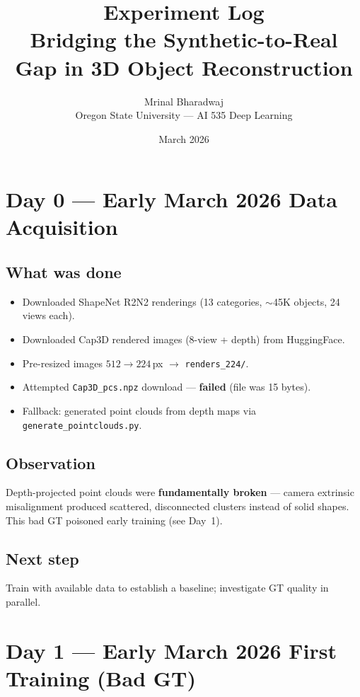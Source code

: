 \documentclass[10pt,a4paper]{article}
\title{\textbf{Experiment Log}\\[0.3em]
\large Bridging the Synthetic-to-Real Gap in 3D Object Reconstruction}
\author{Mrinal Bharadwaj\\Oregon State University --- AI 535 Deep Learning}
\date{March 2026}
\begin{document}
\maketitle
\thispagestyle{fancy}

\section*{Day 0 --- Early March 2026 \hfill \normalfont\small Data Acquisition}

\subsection*{What was done}
\begin{itemize}[nosep]
    \item Downloaded ShapeNet R2N2 renderings (13 categories, $\sim$45K objects, 24 views each).
    \item Downloaded Cap3D rendered images (8-view + depth) from HuggingFace.
    \item Pre-resized images $512 \to 224$\,px $\to$ \texttt{renders\_224/}.
    \item Attempted \texttt{Cap3D\_pcs.npz} download --- \textbf{failed} (file was 15 bytes).
    \item Fallback: generated point clouds from depth maps via \texttt{generate\_pointclouds.py}.
\end{itemize}

\subsection*{Observation}
Depth-projected point clouds were \textbf{fundamentally broken} --- camera extrinsic misalignment produced scattered, disconnected clusters instead of solid shapes. This bad GT poisoned early training (see Day~1).

\subsection*{Next step}
Train with available data to establish a baseline; investigate GT quality in parallel.

\section*{Day 1 --- Early March 2026 \hfill \normalfont\small First Training (Bad GT)}
\end{document}
